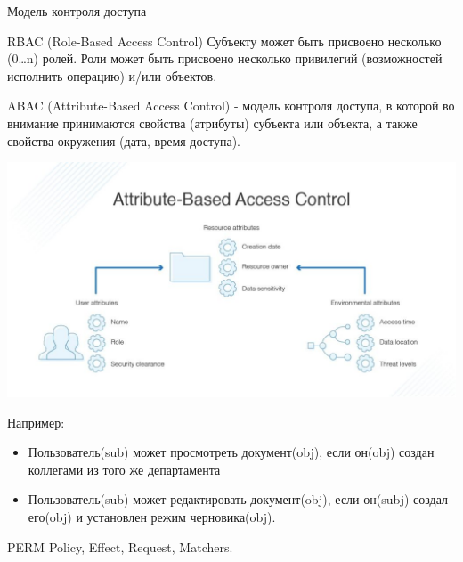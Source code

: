 \documentclass[presentation]{beamer}
\begin{document}
\begin{frame}[label={sec:org374a28e}]{Модель контроля доступа}
\begin{block}{RBAC (Role-Based Access Control)}
Субъекту может быть присвоено несколько (0\ldots{}n) ролей. Роли может быть присвоено несколько привилегий (возможностей исполнить операцию) и/или объектов.
\end{block}



\begin{block}{ABAC (Attribute-Based Access Control)}
\label{org4cc13c0} - модель контроля доступа, в которой во внимание принимаются свойства (атрибуты) субъекта или объекта, а также свойства окружения (дата, время доступа).

\begin{center}
\includegraphics[width=.9\linewidth]{./img/abac.jpg}
\end{center}

Например:
\begin{itemize}
\item Пользователь(sub) может просмотреть документ(obj), если он(obj) создан коллегами из того же департамента
\item Пользователь(sub) может редактировать документ(obj), если он(subj) создал его(obj) и установлен режим черновика(obj).
\end{itemize}
\end{block}

\begin{block}{PERM}
Policy, Effect, Request, Matchers.
\end{block}
\end{frame}
\end{document}
